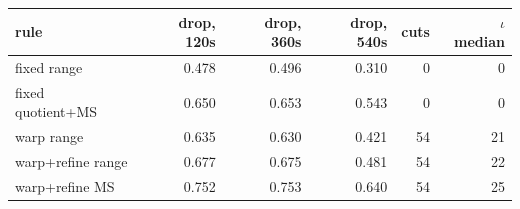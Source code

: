 \begin{tabular}{lrrrrr}
\toprule
rule & drop, 120s & drop, 360s & drop, 540s & cuts & $\iota$ median \\
\midrule
fixed range & 0.478 & 0.496 & 0.310 & 0 & 0 \\
fixed quotient+MS & 0.650 & 0.653 & 0.543 & 0 & 0 \\
warp range & 0.635 & 0.630 & 0.421 & 54 & 21 \\
warp+refine range & 0.677 & 0.675 & 0.481 & 54 & 22 \\
warp+refine MS & 0.752 & 0.753 & 0.640 & 54 & 25 \\
\bottomrule
\end{tabular}
